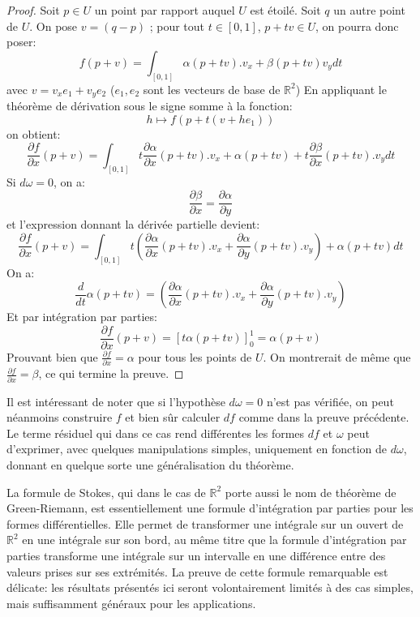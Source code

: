 \begin{proof}
Soit $p \in U$ un point par rapport auquel $U$ est étoilé. Soit $q$ un autre
point de $U$. On pose $v=(q-p)$ ; pour tout $t \in [0,1]$, $p + t v \in U$, on
pourra donc poser:
\[
f(p+v) = \int_{[0,1]} \alpha(p+tv).v_x + \beta(p+tv)v_y dt
\]
avec $v = v_x e_1 + v_y e_2$ ($e_1,e_2$ sont les vecteurs de base de
$\mathbb{R}^2$) En appliquant le théorème de dérivation sous le signe somme à la
fonction:
\[
h \mapsto f(p+t(v+he_1))
\]
on obtient:
\[
\frac{\partial f}{\partial x}(p+v) = \int_{[0,1]} t \frac{\partial
\alpha}{\partial x}(p+tv).v_x + \alpha(p+tv) + t \frac{\partial
\beta }{\partial x}(p+tv).v_y dt
\]
Si $d\omega = 0$, on a:
\[
\frac{\partial
\beta }{\partial x} = \frac{\partial
\alpha }{\partial y}
\]
et l'expression donnant la dérivée partielle devient:
\[
\frac{\partial f}{\partial x}(p+v) = \int_{[0,1]} t \left (\frac{\partial
\alpha}{\partial x}(p+tv).v_x +  \frac{\partial
\alpha }{\partial y}(p+tv).v_y \right) + \alpha(p+tv)  dt
\]
On a:
\[
\frac{d}{dt}\alpha(p+tv) = \left (\frac{\partial
\alpha}{\partial x}(p+tv).v_x +  \frac{\partial
\alpha }{\partial y}(p+tv).v_y \right)
\]
Et par intégration par parties:
\[
\frac{\partial f}{\partial x}(p+v) = \left[t\alpha(p+tv)\right]_0^1 =
\alpha(p+v)
\]
Prouvant bien que $\frac{\partial f}{\partial x} = \alpha$ pour tous les points
de $U$. On montrerait de même que $\frac{\partial f}{\partial x} = \beta$, ce
qui termine la preuve.
\end{proof}
Il est intéressant de noter que si l'hypothèse $d\omega =0$ n'est pas vérifiée,
on peut néanmoins construire $f$ et bien sûr calculer $df$ comme dans la preuve
précédente. Le terme résiduel qui dans ce cas rend différentes les formes $df$
et $\omega$ peut d'exprimer, avec quelques manipulations simples, uniquement en
fonction de $d\omega$, donnant en quelque sorte une généralisation du théorème.

La formule de Stokes, qui dans le cas de $\mathbb{R}^2$ porte aussi le nom de
théorème de Green-Riemann, est essentiellement une formule d'intégration par
parties pour les formes différentielles. Elle permet de transformer une
intégrale sur un ouvert de $\mathbb{R}^2$ en une intégrale sur son bord, au même
titre que la formule d'intégration par parties transforme une intégrale sur un
intervalle en une différence entre des valeurs prises sur ses extrémités.
La preuve de cette formule remarquable est délicate: les résultats présentés
ici seront volontairement limités à des cas simples, mais suffisamment généraux
pour les applications.

